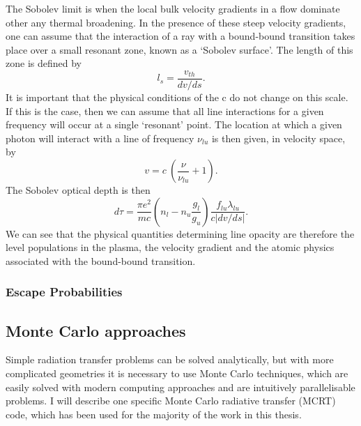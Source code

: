 The Sobolev limit is when the local bulk velocity gradients in a flow 
dominate other any thermal broadening. In the presence of these steep
velocity gradients, one can assume that the interaction of a ray with a bound-bound
transition takes place over a small resonant zone, known as a 
`Sobolev surface'. The length of this zone is defined by
\begin{equation}
l_s = \frac{v_{th}}{dv / ds}.
\end{equation}
It is important that the physical conditions of the c do not change on this scale.
If this is the case, then we can assume that all line interactions for a given 
frequency will occur at a single `resonant' point. The location at which
a given photon will interact with a line of frequency $\nu_{lu}$
is then given, in velocity space, by
\begin{equation}
v = c~\left(\frac{\nu}{\nu_{lu}} + 1\right).
\label{eq:resonance}
\end{equation}
The Sobolev optical depth is then
\begin{equation}
d \tau = \frac{\pi e^2}{m c}  \left(n_l - n_u \frac{g_l}{g_u} \right) \frac{f_{lu} \lambda_{lu}}{c | dv / ds |}.
\label{eq:tau_sob}
\end{equation}
We can see that the physical quantities determining line opacity are therefore 
the level populations in the plasma, the velocity gradient and the atomic physics
associated with the bound-bound transition.

\subsubsection{Escape Probabilities}





\subsection{Monte Carlo approaches}

Simple radiation transfer problems can be solved analytically,
but with more complicated geometries it is necessary to use Monte Carlo
techniques, which are easily solved with modern computing approaches and 
are intuitively parallelisable problems. I will describe one specific 
Monte Carlo radiative transfer (MCRT) code, which has been used
for the majority of the work in this thesis.









